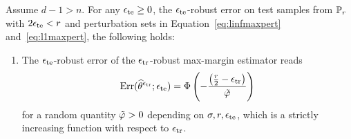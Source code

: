 \begin{theorem}
  \label{thm:linlinf}
  Assume $d-1>n$. 
  For any $\epsilon_{\text{te}} \geq 0$, the $\epsilon_{\text{te}}$-robust error on test samples from $\mathbb{P}_{r}$ with $2 \epsilon_{\text{te}} < r$ and perturbation sets in Equation~\eqref{eq:linfmaxpert} and~\eqref{eq:l1maxpert}, the following holds:
  \begin{enumerate}
  \item
      The $\epsilon_{\text{te}}$-robust error of the $\epsilon_{\text{tr}}$-robust max-margin estimator reads
    \begin{equation}
      \text{Err}(\widehat{\theta}^{\epsilon_{\text{tr}}};\epsilon_{\text{te}}) = \Phi \left( -\frac{\left( \frac{r}{2}-\epsilon_{\text{tr}} \right) }{\tilde{\varphi}} \right)
    \end{equation}
    for a random quantity $\tilde{\varphi}>0$ depending on $\sigma, r,\epsilon_{\text{te}}$, which is a strictly increasing function with respect to $\epsilon_{\text{tr}}$.
     


\end{enumerate}
\end{theorem}

